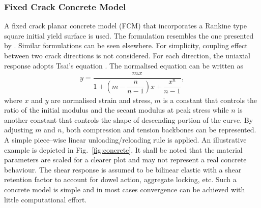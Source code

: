 \documentclass[3p,review,sort&compress,11pt,fleqn]{elsarticle}
\newcommand*{\figref}[1]{Fig.~\ref{#1}}
\begin{document}
\subsubsection{Fixed Crack Concrete Model}
A fixed crack planar concrete model (FCM) that incorporates a Rankine type square initial yield surface is used. The formulation resembles the one presented by \citet{Crisfield1989}. Similar formulations can be seen elsewhere. For simplicity, coupling effect between two crack directions is not considered. For each direction, the uniaxial response adopts Tsai's equation \citep{Tsai1988}. The normalised equation can be written as
\begin{gather*}
y=\dfrac{mx}{1+\left(m-\dfrac{n}{n-1}\right)x+\dfrac{x^n}{n-1}},
\end{gather*}
where $x$ and $y$ are normalised strain and stress, $m$ is a constant that controls the ratio of the initial modulus and the secant modulus at peak stress while $n$ is another constant that controls the shape of descending portion of the curve. By adjusting $m$ and $n$, both compression and tension backbones can be represented. A simple piece--wise linear unloading/reloading rule is applied. An illustrative example is depicted in \figref{fig:concrete}. It shall be noted that the material parameters are scaled for a clearer plot and may not represent a real concrete behaviour. The shear response is assumed to be bilinear elastic with a shear retention factor to account for dowel action, aggregate locking, etc. Such a concrete model is simple and in most cases convergence can be achieved with little computational effort.
\end{document}
